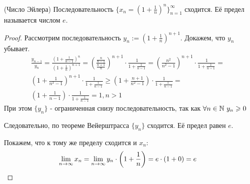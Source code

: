 \begin{theorem} (Число Эйлера)
	Последовательность $\{x_n = \left(1 + \frac{1}{n}\right)^n\}_{n = 1}^\infty$ сходится. Её предел называется числом $e$.
\end{theorem}

\begin{proof}
	Рассмотрим последовательность $y_n := \left(1 + \frac{1}{n}\right)^{n + 1}$. Докажем, что $y_n$ убывает.
	\begin{multline*}
		\frac{y_{n - 1}}{y_n} = \frac{(1 + \frac{1}{n - 1})^n}{(1 + \frac{1}{n})^{n + 1}} = \left(\frac{\frac{n}{n - 1}}{\frac{n + 1}{n}}\right)^{n+1} \cdot \frac{1}{1 + \frac{1}{n - 1}} = \left(\frac{n^2}{n^2 - 1}\right)^{n+1} \cdot \frac{1}{1 + \frac{1}{n - 1}} = \\
		\left(1 + \frac{1}{n^2 - 1}\right)^{n+1} \cdot \frac{1}{1 + \frac{1}{n - 1}} \ge \left(1 + \frac{n + 1}{n^2 - 1}\right) \cdot \frac{1}{1 + \frac{1}{n - 1}} = \\
		\left(1 + \frac{1}{n - 1}\right) \cdot \frac{1}{1 + \frac{1}{n - 1}} = 1, n > 1
	\end{multline*}
	При этом $\{y_n\}$ - ограниченная снизу последовательность, так как $\forall n \in \mathbb{N}\ y_n \geqslant 0$
	
	Следовательно, по теореме Вейерштрасса $\{y_n\}$ сходится. Её предел равен $e$.
	
	Покажем, что к тому же пределу сходится и $x_n$:
	$$
		\lim\limits_{n \to \infty} x_n = \lim\limits_{n \to \infty} y_n \cdot \left(1 + \frac{1}{n}\right) = e \cdot (1 + 0) = e
	$$
\end{proof}